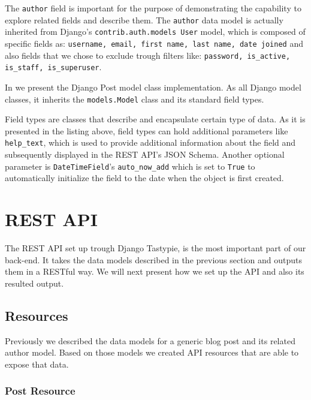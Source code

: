 The \texttt{author} field is important for the purpose of demonstrating the capability to explore related fields and describe them. The \texttt{author} data model is actually inherited from Django's \texttt{contrib.auth.models User} model, which is composed of specific fields as: \texttt{username, email, first name, last name, date joined} and also fields that we chose to exclude trough filters like: \texttt{password, is\_active, is\_staff, is\_superuser}.

In  we present the Django Post model class implementation. As all Django model classes, it inherits the \texttt{models.Model} class and its standard field types.



Field types are classes that describe and encapsulate certain type of data. As it is presented in the listing above, field types can hold additional parameters like \texttt{help\_text}, which is used to provide additional information about the field and subsequently displayed in the REST API's JSON Schema. Another optional parameter is \texttt{DateTimeField}'s \texttt{auto\_now\_add} which is set to \texttt{True} to automatically initialize the field to the date when the object is first created.
		

\section{REST API}
\label{sec:api}

The REST API set up trough Django Tastypie, is the most important part of our back-end. It takes the data models described in the previous section and outputs them in a RESTful way. We will next present how we set up the API and also its resulted output.

\subsection{Resources}
\label{sub-sec:resources}

Previously we described the data models for a generic blog post and its related author model. Based on those models we created API resources that are able to expose that data.

\subsubsection{Post Resource}
\label{sub-sub-sec:post-resource}

